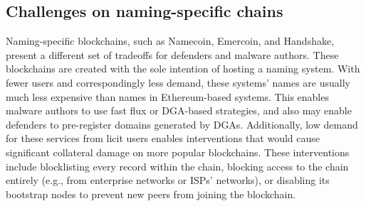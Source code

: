 \subsection{Challenges on naming-specific chains}

Naming-specific blockchains, such as Namecoin, Emercoin, and Handshake, 
present 
a different set of tradeoffs for defenders and malware authors. These 
blockchains are created with the sole intention of hosting a naming system. 
With fewer users and correspondingly less demand, these systems' names are 
usually much less expensive than names in Ethereum-based systems. This enables 
malware 
authors to use fast flux or DGA-based strategies, and also may enable 
defenders 
to pre-register domains generated by DGAs. Additionally, low demand for 
these 
services from licit users enables interventions that would cause significant 
collateral damage on more popular blockchains. These interventions include 
blocklisting every record within the chain, blocking access to the chain 
entirely (e.g., from enterprise networks or ISPs' networks), or disabling 
its 
bootstrap nodes to prevent new peers from joining the blockchain.